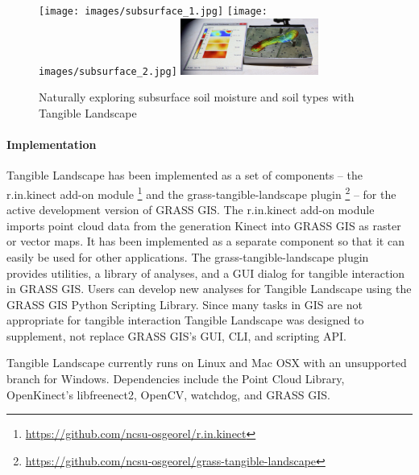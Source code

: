 \documentclass[prodmode,acmtochi]{acmsmall} %
\begin{document}
\begin{figure}[h!]
\begin{center}
		\texttt{[image: images/subsurface\_1.jpg]}
		\texttt{[image: images/subsurface\_2.jpg]}
		\includegraphics[height=70px]{images/subsurface_3.jpg}
	\caption{Naturally exploring subsurface soil moisture and soil types with Tangible Landscape}
	\label{fig:subsurface}
\end{center}
\end{figure}

\paragraph{Implementation}
Tangible Landscape has been implemented as a set of components 
-- the r.in.kinect add-on module 
\footnote{\url{https://github.com/ncsu-osgeorel/r.in.kinect}}
and the grass-tangible-landscape plugin 
\footnote{\url{https://github.com/ncsu-osgeorel/grass-tangible-landscape}} --
for the active development version of GRASS GIS. 
%
The r.in.kinect add-on module imports point cloud data from the  generation Kinect into GRASS GIS as raster or vector maps. 
It has been implemented as a separate component so that it can easily be used for other applications.
%
The grass-tangible-landscape plugin provides 
utilities, a library of analyses, and a GUI dialog for tangible interaction in GRASS GIS.
%
Users can develop new analyses for Tangible Landscape 
using the GRASS GIS Python Scripting Library.  %
%
Since many tasks in GIS are not appropriate for tangible interaction
Tangible Landscape was designed to supplement, 
not replace GRASS GIS's GUI, CLI, and scripting API. 

Tangible Landscape currently runs on Linux and Mac OSX 
with an unsupported branch for Windows. 
%
Dependencies include the Point Cloud Library, OpenKinect's libfreenect2, 
OpenCV,  watchdog, and GRASS GIS.
\end{document}
